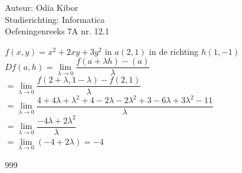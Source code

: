 \documentclass[a4paper]{article}
\begin{document}
  
\noindent \large Auteur: Odia Kibor \\
\noindent \large Studierichting: Informatica\\
\noindent \large Oefeningenreeks 7A nr. 12.1
\\

\medskip

\normalsize


$f(x,y) = x^2 + 2xy + 3y^2$ in $a(2,1)$ in de richting $h(1,-1)$\\

$Df(a,h) = \lim\limits_{\lambda\rightarrow 0} \dfrac{f(a + \lambda h) - (a)}{\lambda}$\\

$= \lim\limits_{\lambda\rightarrow 0} \dfrac{f\left(2 + \lambda,1 - \lambda\right) - f(2,1)}{\lambda}$\\

$= \lim\limits_{\lambda\rightarrow 0} \dfrac{4 + 4\lambda + \lambda^2 + 4 - 2\lambda - 2\lambda^2 + 3 - 6\lambda + 3\lambda^2 - 11}{\lambda}$\\

$= \lim\limits_{\lambda\rightarrow 0} \dfrac{-4\lambda + 2\lambda^2}{\lambda}$\\

$= \lim\limits_{\lambda\rightarrow 0} (-4 + 2\lambda) = -4$\\




















\begin{thebibliography}{999}
\end{thebibliography}
\end{document}
